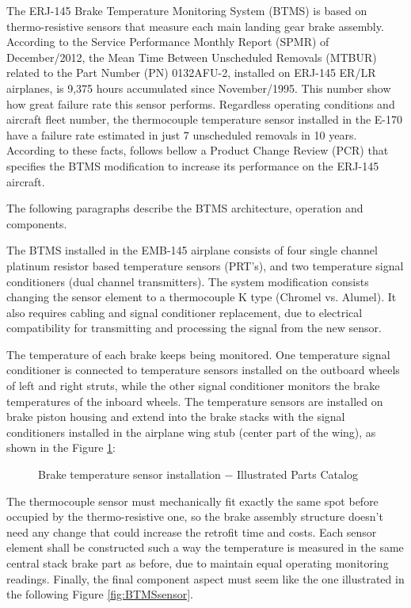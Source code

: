 The ERJ-145 Brake Temperature Monitoring System (BTMS) is based on thermo-resistive sensors that measure each main landing gear brake assembly. According to the Service Performance Monthly Report (SPMR) of December/2012, the Mean Time Between Unscheduled Removals (MTBUR) related to the Part Number (PN) 0132AFU-2, installed on ERJ-145 ER/LR airplanes, is 9,375 hours accumulated since November/1995. This number show how great failure rate this sensor performs. Regardless operating conditions and aircraft fleet number, the thermocouple temperature sensor installed in the E-170 have a failure rate estimated in just 7 unscheduled removals in 10 years. According to these facts, follows bellow a Product Change Review (PCR) that specifies the BTMS modification to increase its performance on the ERJ-145 aircraft.

The following paragraphs describe the BTMS architecture, operation and components.

The BTMS installed in the EMB-145 airplane consists of four single channel platinum resistor based temperature sensors (PRT's), and two temperature signal conditioners (dual channel transmitters). The system modification consists changing the sensor element to a thermocouple K type (Chromel vs. Alumel). It also requires cabling and signal conditioner replacement, due to electrical compatibility for transmitting and processing the signal from the new sensor.

The temperature of each brake keeps being monitored. One temperature signal conditioner is connected to temperature sensors installed on the outboard wheels of left and right struts, while the other signal conditioner monitors the brake temperatures of the inboard wheels. The temperature sensors are installed on brake piston housing and extend into the brake stacks with the signal conditioners installed in the airplane wing stub (center part of the wing), as shown in the Figure \ref{fig:BTMSassembly}:

\begin{figure}[H] %
    \caption{Brake temperature sensor installation $-$ Illustrated Parts Catalog}
    \label{fig:BTMSassembly}
\end{figure}


The thermocouple sensor must mechanically fit exactly the same spot before occupied by the thermo-resistive one, so the brake assembly structure doesn't need any change that could increase the retrofit time and costs. Each sensor element shall be constructed such a way the temperature is measured in the same central stack brake part as before, due to maintain equal operating monitoring readings. Finally, the final component aspect must seem like the one illustrated in the following Figure \ref{fig:BTMSsensor}.


